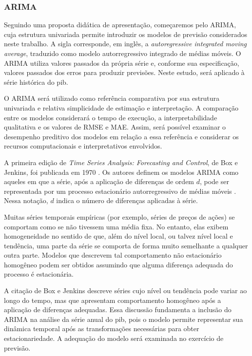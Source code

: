 \subsubsection{ARIMA}

Seguindo uma proposta didática de apresentação, começaremos pelo ARIMA, cuja estrutura univariada permite introduzir os modelos de previsão considerados neste trabalho. A sigla corresponde, em inglês, a \textit{autoregressive integrated moving average}, traduzido como modelo autorregressivo integrado de médias móveis. O ARIMA utiliza valores passados da própria série e, conforme sua especificação, valores passados dos erros para produzir previsões. Neste estudo, será aplicado à série histórica do \ac{pib}.

O ARIMA será utilizado como referência comparativa por sua estrutura univariada e relativa simplicidade de estimação e interpretação. A comparação entre os modelos considerará o tempo de execução, a interpretabilidade qualitativa e os valores de RMSE e MAE. Assim, será possível examinar o desempenho preditivo dos modelos em relação a essa referência e considerar os recursos computacionais e interpretativos envolvidos.

A primeira edição de \textit{Time Series Analysis: Forecasting and Control}, de Box e Jenkins, foi publicada em 1970 . Os autores definem os modelos ARIMA como aqueles em que a série, após a aplicação de diferenças de ordem $d$, pode ser representada por um processo estacionário autorregressivo de médias móveis . Nessa notação, $d$ indica o número de diferenças aplicadas à série.

\begin{citacao}
	Muitas séries temporais empíricas (por exemplo, séries de preços de ações) se comportam como se não tivessem uma média fixa. No entanto, elas exibem homogeneidade no sentido de que, além do nível local, ou talvez nível local e tendência, uma parte da série se comporta de forma muito semelhante a qualquer outra parte. Modelos que descrevem tal comportamento não estacionário homogêneo podem ser obtidos assumindo que alguma diferença adequada do processo é estacionária. 
\end{citacao}

A citação de Box e Jenkins descreve séries cujo nível ou tendência pode variar ao longo do tempo, mas que apresentam comportamento homogêneo após a aplicação de diferenças adequadas. Essa discussão fundamenta a inclusão do ARIMA na análise da série anual do \ac{pib}, pois o modelo permite representar sua dinâmica temporal após as transformações necessárias para obter estacionariedade. A adequação do modelo será examinada no exercício de previsão.

